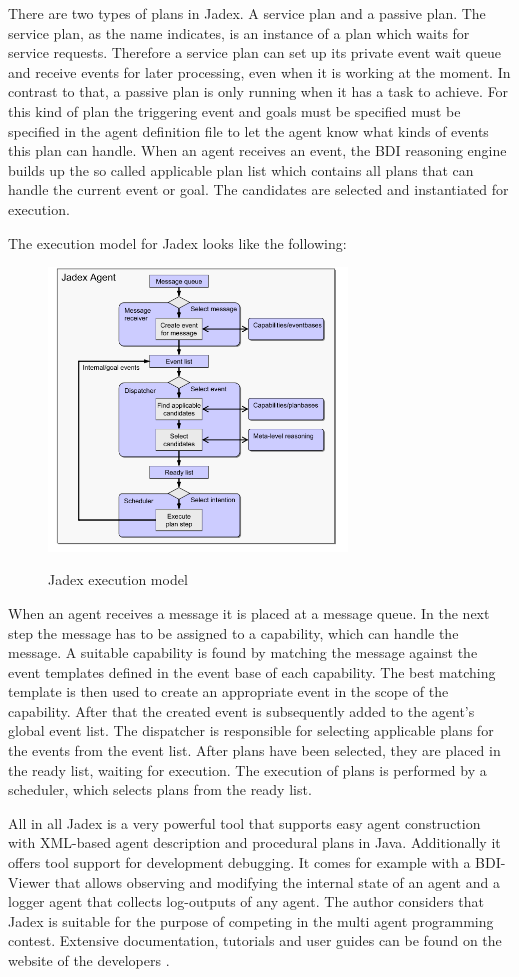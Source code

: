 There are two types of plans in Jadex. A service plan and a passive plan. The service plan, as the name indicates, is an instance of a plan which waits for service requests. Therefore a service plan  can set up its private event wait queue and receive events for later processing, even when it is working at the moment. In contrast to that, a passive plan is only running when it has a task to achieve. For this kind of plan the triggering event and goals must be specified must be specified in the agent definition file to let the agent know what kinds of events this plan can handle. When an agent receives an event, the BDI reasoning engine builds up the so called applicable plan list which contains all plans that can handle the current event or goal. The candidates are selected and instantiated for execution.

The execution model for Jadex looks like the following:
\begin{figure}
	\centering
	\includegraphics[width=300px]{images/Jadex_execution_model.png}
	\label{fig3}
	\caption{Jadex execution model \cite{Pokahr}}
\end{figure}
\newline
When an agent receives a message it is placed at a message queue. In the next step the message has to be assigned to a capability, which can handle the message. A suitable capability is found by matching the message against the event templates defined in the event base of each capability. The best matching template is then used to create an appropriate event in the scope of the capability. After that the created event is subsequently added to the agent's global event list. The dispatcher is responsible for selecting applicable plans for the events from the event list. After plans have been selected, they are placed in the ready list, waiting for execution. The execution of plans is performed by a scheduler, which selects plans from the ready list. 

All in all Jadex is a very powerful tool that supports easy agent construction with XML-based agent description and procedural plans in Java. Additionally it offers tool support for development debugging. It comes for example with a BDI-Viewer that allows observing and modifying the internal state of an agent and a logger agent that collects log-outputs of any agent. The author considers that Jadex is suitable for the purpose of competing in the multi agent programming contest. Extensive documentation, tutorials and user guides can be found on the website of the developers \cite{Jadex}.
